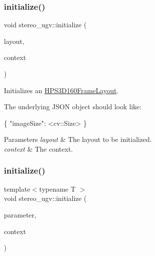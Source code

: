 \subsubsection{\texorpdfstring{initialize()}{initialize()}\hspace{0.1cm}{\footnotesize\ttfamily [1/8]}}
{\footnotesize\ttfamily void stereo\+\_\+ugv\+::initialize (\begin{DoxyParamCaption}\item[{\hyperlink{classstereo__ugv_1_1HPS3D160FrameLayout}{H\+P\+S3\+D160\+Frame\+Layout} $\ast$}]{layout,  }\item[{const \hyperlink{classstereo__ugv_1_1Context}{Context} \&}]{context }\end{DoxyParamCaption})}



Initializes an \hyperlink{classstereo__ugv_1_1HPS3D160FrameLayout}{H\+P\+S3\+D160\+Frame\+Layout}. 

The underlying J\+S\+ON object should look like\+: 
\begin{DoxyCode}
\{
  \textcolor{stringliteral}{"imageSize"}: <cv::Size>
\}
\end{DoxyCode}
 
\begin{DoxyParams}{Parameters}
{\em layout} & The layout to be initialized. \\
\hline
{\em context} & The context. \\
\hline
\end{DoxyParams}
\mbox{\label{namespacestereo__ugv_a6971cc11001fdf589a71f6fb3099c65b}} 
\subsubsection{\texorpdfstring{initialize()}{initialize()}\hspace{0.1cm}{\footnotesize\ttfamily [2/8]}}
{\footnotesize\ttfamily template$<$typename T $>$ \\
void stereo\+\_\+ugv\+::initialize (\begin{DoxyParamCaption}\item[{T $\ast$}]{parameter,  }\item[{const \hyperlink{classstereo__ugv_1_1Context}{Context} \&}]{context }\end{DoxyParamCaption})\hspace{0.3cm}{\ttfamily [inline]}}



